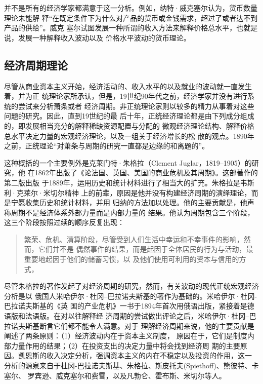 并不是所有的经济学家都满意于这一分析。例如，纳特·威克塞尔认为，货币数量理论未能解
释“在既定条件下为什么对产品的货币或金钱需求，超过了或者达不到产品的供给”。威克
塞尔试图发展一种所谓的收入方法来解释价格总水平，也就是说，发展一种解释收入波动以及
价格水平波动的货币理论。

\subsection{经济周期理论}

尽管从商业资本主义开始，经济活动的、收入水平的以及就业的波动就一直发生着，并为正
统理论家所承认，但是，19世纪90年代之前，经济学家并没有进行系统的尝试来分析萧条或者
经济周期。非正统理论家则以较多的精力从事着对这些问题的研究。因此，直到19世纪的最
后十年，正统经济理论都是由下列成分组成的，即发展相当充分的解释稀缺资源配置与分配的
微观经济理论结构、解释价格总水平决定力量的宏观经济理论，以及一组关于经济增长的松
散的观点。1890年之前，正统理论“对萧条与周期的研究一直都是边缘的和离题的”。

这种概括的一个主要例外是克莱门特·朱格拉（Clement Juglar，1819--1905）的研究，他
在1862年出版了《论法国、英国、美国的商业危机及其周期》。这部著作的第二版出版
于1889年，运用历史和统计材料进行了相当大的扩充。朱格拉是韦斯利·克莱尔·米切尔精神
上的前辈，原因是他并没有构建经济周期的演绎理论，而是宁愿收集历史和统计材料，并用
归纳的方法加以处理。他的主要贡献是，他声称周期不是经济体系外部力量而是内部力量的
结果。他认为周期包含三个阶段，这三个阶段按照过续的顺序反复出现：

\begin{quotation}
  繁荣、危机、清算阶段，尽管受到人们生活中幸运和不幸事件的影响，然而，它们并不是
  偶然事件的结果，而是起因于全体居民的行为与活动，最重要地起因于他们的储蓄习惯，以
  及他们使用可利用的资本与信用的方式，
\end{quotation}

尽管朱格拉的著作发起了对经济周期的研究，然而，有关波动的现代正统宏观经济分析是以
俄国人米哈伊尔·杜冈--巴拉诺夫斯基的著作为基础的。米哈伊尔·杜冈-巴拉诺夫斯基的《英
国的产业危机》一书于1894年首次用俄语出版，紧接着是德语版和法语版。在对以往解释经
济周期的尝试做出评论之后，米哈伊尔·杜冈--巴拉诺夫斯基断言它们都不能令人满意。对于
理解经济周期来说，他的主要贡献是阐述了两条原则：（1）经济波动内在于资本主义制度，
原因在于，它们是制度内部力量作用的结果；（2）在投资支出的决定力量中将会找到经济周
期的主要原因。凯恩斯的收入决定分析，强调资本主义的内在不稳定以及投资的作用，这一
分析的源泉来自于杜冈-巴拉诺夫斯基、朱格拉、斯皮托夫(Spiethoff)、熊彼特、卡塞尔、
罗宾逊、威克塞尔和费雪，以及凡勃仑、霍布斯、米切尔等人。

